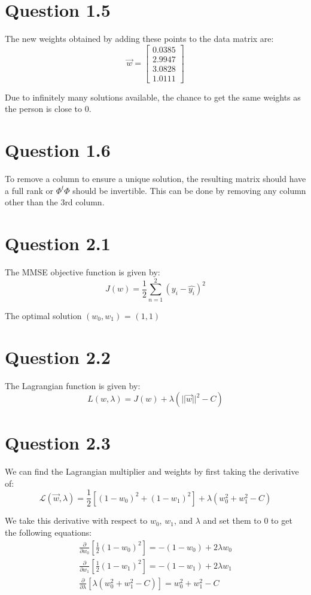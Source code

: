 \documentclass{article}
\begin{document}
\section*{Question 1.5}
The new weights obtained by adding these points to the data matrix are:
$$
\vec{w} = \begin{bmatrix}
    0.0385 \\
    2.9947 \\
    3.0828 \\
    1.0111
\end{bmatrix}
$$

\noindent Due to infinitely many solutions available, the chance to get the same weights
as the person is close to 0.

\section*{Question 1.6}
To remove a column to ensure a unique solution, the resulting matrix should have
a full rank or $\Phi^t\Phi$ should be invertible. This can be done by removing
any column other than the 3rd column.

\section*{Question 2.1}
The MMSE objective function is given by:
$$
J(w) = \frac{1}{2} \sum_{n=1}^{2} (y_i - \hat{y_i})^2
$$

\noindent The optimal solution $(w_0, w_1)$ = $(1, 1)$

\section*{Question 2.2}
The Lagrangian function is given by:
$$
L(w, \lambda) = J(w) + \lambda (||\vec{w}||^2 - C )
$$

\section*{Question 2.3}
We can find the Lagrangian multiplier and weights by first taking the derivative of:
$$
\mathcal{L}(\vec{w}, \lambda) = \frac{1}{2} \left[ (1 - w_0)^2 + (1 - w_1)^2 \right] + \lambda \left( w_0^2 + w_1^2 - C \right)
$$

We take this derivative with respect to $w_0$, $w_1$, and $\lambda$ and set them to 0 to get the following equations:
\begin{align*}
    \frac{\partial}{\partial w_0} \left[ \frac{1}{2} (1 - w_0)^2 \right] = -(1 - w_0) + 2 \lambda w_0\\
    \frac{\partial}{\partial w_1} \left[ \frac{1}{2} (1 - w_1)^2 \right] = -(1 - w_1) + 2 \lambda w_1\\
    \frac{\partial}{\partial \lambda} \left[ \lambda (w_0^2 + w_1^2 - C) \right] = w_0^2 + w_1^2 - C
\end{align*}
\end{document}
